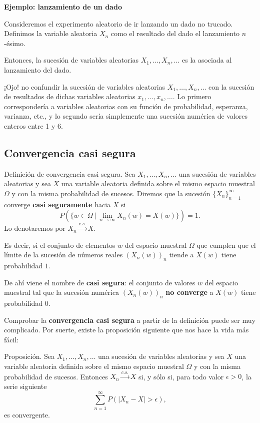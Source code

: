\documentclass[]{book}
\begin{document}
\textbf{Ejemplo: lanzamiento de un dado}

Consideremos el experimento aleatorio de ir lanzando un dado no trucado. Definimos la variable aleatoria \(X_n\) como el resultado del dado el lanzamiento \(n\)-ésimo.

Entonces, la sucesión de variables aleatorias \(X_1,\ldots,X_n,\ldots\) es la asociada al lanzamiento del dado.

¡Ojo! no confundir la sucesión de variables aleatorias \(X_1,\ldots,X_n,\ldots\) con la sucesión de resultados de dichas variables aleatorias \(x_1,\ldots, x_n,\ldots\). Lo primero correspondería a variables aleatorias con su función de probabilidad, esperanza, varianza, etc., y lo segundo sería simplemente una sucesión numérica de valores enteros entre 1 y 6.

\hypertarget{convergencia-casi-segura}{%
\subsection{Convergencia casi segura}\label{convergencia-casi-segura}}

Definición de convergencia casi segura.
Sea \(X_1,\ldots,X_n,\ldots\) una sucesión de variables aleatorias y sea \(X\) una variable aleatoria definida sobre el mismo espacio muestral \(\Omega\) y con la misma probabilidad de sucesos. Diremos que la sucesión \(\{X_n\}_{n=1}^\infty\) converge \textbf{casi seguramente} hacia \(X\) si
\[
P\left(\{w\in \Omega\ |\ \lim_{n\to\infty} X_n(w)=X(w)\}\right)=1.
\]
Lo denotaremos por \(X_n\stackrel{c.s.}{\longrightarrow}X\).

Es decir, si el conjunto de elementos \(w\) del espacio muestral \(\Omega\) que cumplen que el límite de la sucesión de números reales \((X_n(w))_n\) tiende a \(X(w)\) tiene probabilidad \(1\).

De ahí viene el nombre de \textbf{casi segura}: el conjunto de valores \(w\) del espacio muestral tal que la sucesión numérica \((X_n(w))_n\) \textbf{no converge} a \(X(w)\) tiene probabilidad 0.

Comprobar la \textbf{convergencia casi segura} a partir de la definición puede ser muy complicado. Por suerte, existe la proposición siguiente que nos hace la vida más fácil:

Proposición.
Sea \(X_1,\ldots,X_n,\ldots\) una sucesión de variables aleatorias y sea \(X\) una variable aleatoria definida sobre el mismo espacio muestral \(\Omega\) y con la misma probabilidad de sucesos.
Entonces \(X_n\stackrel{c.s.}{\longrightarrow}X\) si, y sólo si, para todo valor \(\epsilon >0\), la serie siguiente
\[
\sum_{n=1}^\infty P(|X_n-X|>\epsilon),
\]
es convergente.
\end{document}
